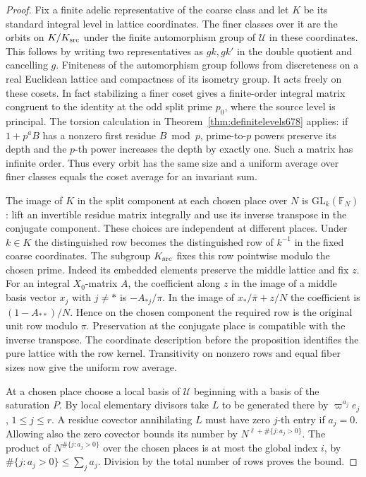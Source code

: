 \documentclass[a4paper,11pt]{article}
\theoremstyle{definition}
\theoremstyle{remark}
\numberwithin{equation}{section}
\begin{document}
\begin{proof}
Fix a finite adelic representative of the coarse class and
let \(K\) be its standard integral level in lattice coordinates.
The finer classes over it are the orbits on
\(K/K_{\rm src}\) under the finite automorphism group of
\(\mathcal U\) in these coordinates. This follows by writing
two representatives as \(gk,gk'\) in the double quotient
and cancelling \(g\). Finiteness of the automorphism group
follows from discreteness on a real Euclidean lattice and
compactness of its isometry group. It acts freely on these
cosets. In fact stabilizing a finer coset gives a finite-order
integral matrix congruent to the identity at the odd split
prime \(p_0\), where the source level is principal. The
torsion calculation in Theorem~\ref{thm:definitelevels678} applies:
if \(1+p^a B\) has a nonzero first residue \(B\bmod p\),
prime-to-\(p\) powers preserve its depth and the \(p\)-th
power increases the depth by exactly one. Such a matrix
has infinite order. Thus every orbit has the same size and
a uniform average over finer classes equals the coset
average for an invariant sum.

The image of \(K\) in the split component at each chosen
place over \(N\) is \(\mathrm{GL}_k(\mathbb F_N)\): lift an
invertible residue matrix integrally and use its inverse
transpose in the conjugate component. These choices are
independent at different places. Under \(k\in K\) the
distinguished row becomes the distinguished row of \(k^{-1}\)
in the fixed coarse coordinates. The subgroup \(K_{\rm src}\)
fixes this row pointwise modulo the chosen prime. Indeed its
embedded elements preserve the middle lattice and fix \(z\).
For an integral \(X_0\)-matrix \(A\), the coefficient along
\(z\) in the image of a middle basis vector \(x_j\) with
\(j\ne *\) is \(-A_{*j}/\pi\). In the image of
\(x_*/\bar\pi+z/N\) the coefficient is
\((1-A_{**})/N\). Hence on the chosen component the required
row is the original unit row modulo \(\pi\). Preservation at
the conjugate place is compatible with the inverse transpose.
The coordinate description before the proposition identifies
the pure lattice with the row kernel. Transitivity on nonzero
rows and equal fiber sizes now give the uniform row average.

At a chosen place choose a local basis of \(\mathcal U\)
beginning with a basis of the saturation \(P\). By local
elementary divisors take \(L\) to be generated there by
\(\varpi^{a_j}e_j\), \(1\le j\le r\). A residue covector
annihilating \(L\) must have zero \(j\)-th entry if \(a_j=0\).
Allowing also the zero covector bounds its number by
\(N^{\ell+\#\{j:a_j>0\}}\). The product of
\(N^{\#\{j:a_j>0\}}\) over the chosen places is at most the
global index \(i\), by \(\#\{j:a_j>0\}\le\sum_j a_j\).
Division by the total number of rows proves the bound.
\end{proof}
\end{document}
